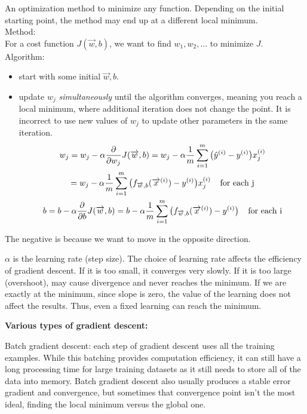 \documentclass[12pt]{report}
\begin{document}
An optimization method to minimize any function. Depending on the initial starting point, the method may end up at a different local minimum. \\

Method: \\
For a cost function $J(\overrightarrow{w},b)$,  we want to find  $w_1, w_2, ...$ to minimize $J$.\\

Algorithm: \\
\begin{itemize}
\item start with some initial $\overrightarrow{w}, b$.
\item update $w_j$ \textit{simultaneously} until the algorithm converges, meaning you reach a local minimum, where additional iteration does not change the point. It is incorrect to use new values of $w_j$ to update other parameters in the same iteration.
\begin{multline}
  w_j = w_j - \alpha \frac{\partial}{\partial w_j} J(\overrightarrow{w},b) = w_j - \alpha  \frac{1}{m} \sum_{i=1}^{m} \big(\hat{y}^{(i)}  - y^{(i)} \big) x_j^{(i)}  \\
  = w_j - \alpha  \frac{1}{m} \sum_{i=1}^{m} \big( f_{\overrightarrow{w},b} (\overrightarrow{x}^{(i)})  - y^{(i)} \big) x_j^{(i)}    \text{\: \: for each j} \\
  b = b - \alpha \frac{\partial  }{\partial b} J(\overrightarrow{w},b) = b - \alpha \frac{1}{m} \sum_{i=1}^{m} \big( f_{\overrightarrow{w},b} (\overrightarrow{x}^{(i)})  - y^{(i)} \big) \text{\: \: for each i}
\end{multline}
\end{itemize}

The negative is because we want to move in the opposite direction.

$\alpha$ is the learning rate (step size). The choice of learning rate affects the efficiency of gradient descent. If it is too small, it converges very slowly. If it is too large (overshoot), may cause divergence and never reaches the minimum. If we are exactly at the minimum, since slope is zero, the value of the learning does not affect the results. Thus, even a fixed learning can reach the minimum.

\textbf{Various types of gradient descent: }

Batch gradient descent: each step of gradient descent uses all the training examples. While this batching provides computation efficiency, it can still have a long processing time for large training datasets as it still needs to store all of the data into memory. Batch gradient descent also usually produces a stable error gradient and convergence, but sometimes that convergence point isn't the most ideal, finding the local minimum versus the global one.
\end{document}
